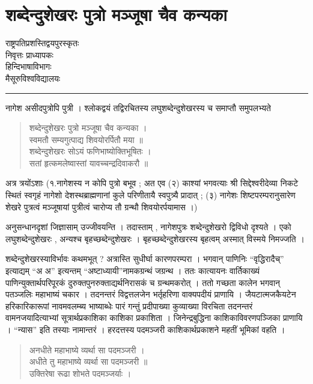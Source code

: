 \chapter{शब्देन्दुशेखरः पुत्रो मञ्जूषा चैव कन्यका}

\begin{center}
\smallskip

राष्ट्रपतिप्रशस्तिद्वयपुरस्कृतः\\
निवृत्तः प्राध्यापकः\\
हिन्दिभाषाविभागः\\
मैसूरुविश्वविद्यालयः
\rule{\textwidth}{0.1pt}
\end{center}

नागेश असीदपुत्रोपि पुत्री । श्लोकद्वयं तद्विरचितस्य लघुशब्देन्दुशेखरस्य च समाप्तौ समुपलभ्यते

\begin{verse}
शब्देन्दुशेखरः पुत्रो मञ्जूषा चैव कन्यका  ।\\
स्वमतौ सम्यगुत्पाद्य शिवयोरर्पितौ मया ॥\\
शब्देन्दुशेखरः सोऽयं फणिभाष्योक्तिभूषितः ।\\
सतां हृत्कमलेष्वास्तां यावच्चन्द्रदिवाकरौ ॥
\end{verse}

अत्र त्रयोंऽशाः (१.नागेशस्य न कोपि पुत्रो बभूव ; अत एव (२) काश्यां भगवत्याः श्री सिद्देश्वरीदेव्या निकटे स्थितं स्वगृहं नागेशो देशस्थब्राह्मणानां कुले परिणीतायै स्वपुत्र्यै प्रादात् ; (३) नागेशः शिष्टपरम्परानुसारेण शेखरे पुत्रत्वं मञ्जूषायां पुत्रीत्वं चारोप्य तौ ग्रन्थौ शिवयोरर्पयामास ।)  

अनुसन्धानदृशां जिज्ञासाम् उज्जीवयन्ति । तदास्ताम् , नागेशपुत्रः शब्देन्दुशेखरो द्विविधो दृश्यते । एको लघुशब्देन्दुशेखरः , अन्यश्च बृहच्छब्देन्दुशेखरः । बृहच्छब्देन्दुशेखरस्य बृहत्वम् अस्मात् विस्मये निमज्जति ।

शब्देन्दुशेखरस्याविर्भावः कथमभूत् ? अत्रास्ति सुधीर्घा कारणपरम्परा । भगवान् पाणिनिः “वृद्धिरादैच्” इत्याद्यम् “अ अ” इत्यन्तम् “अष्टाध्यायी”नामकग्रन्थं जग्रन्थ । ततः कात्यायनः वार्तिकाख्यं पाणिन्युक्तार्थपरिपूरकं दुरुक्तपुनरुक्ताद्यर्थनिरासकं च ग्रन्थमकरोत् । ततो गच्छता कालेन भगवान् पतञ्जलिः महाभाष्यं चकार । तदनन्तरं विद्वत्तलजेन भर्तृहरिणा वाक्यपदीयं प्राणायि । जैयटात्मजकैयटेन हरिकारिकारूपां नावमवलम्ब्य भाष्याब्धेः पारं गन्तुं प्रदीपाख्या कुव्याख्या विरचिता तदनन्तरं वामनजयादित्याभ्यां सूत्रार्थप्रकाशिका काशिका प्रकाशिता । जिनेन्द्रबुद्धिना काशिकाविवरणपञ्जिका प्राणायि । “न्यास” इति तस्याः नामान्तरं । हरदत्तस्य पदमञ्जरी काशिकार्थप्रकाशने महतीं भूमिकां वहति ।

\begin{verse}
अनधीते महाभाष्ये व्यर्था सा पदमञ्जरी ।\\
अधीते तु महाभाष्ये व्यर्था सा पदमञ्जरी ॥\\
उक्तिरेषा रूढा शोभते पदमञ्जर्याः ।
\end{verse}


